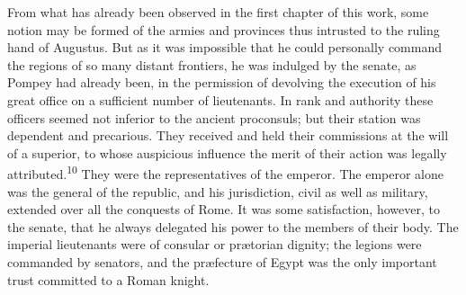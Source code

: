 

From what has already been observed in the first chapter of this
work, some notion may be formed of the armies and provinces thus
intrusted to the ruling hand of Augustus. But as it was
impossible that he could personally command the regions of so
many distant frontiers, he was indulged by the senate, as Pompey
had already been, in the permission of devolving the execution of
his great office on a sufficient number of lieutenants. In rank
and authority these officers seemed not inferior to the ancient
proconsuls; but their station was dependent and precarious. They
received and held their commissions at the will of a superior, to
whose auspicious influence the merit of their action was legally
attributed.\textsuperscript{10} They were the representatives of the emperor. The
emperor alone was the general of the republic, and his
jurisdiction, civil as well as military, extended over all the
conquests of Rome. It was some satisfaction, however, to the
senate, that he always delegated his power to the members of
their body. The imperial lieutenants were of consular or
prætorian dignity; the legions were commanded by senators, and
the præfecture of Egypt was the only important trust committed to
a Roman knight.


